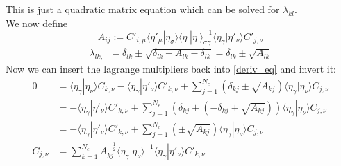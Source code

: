 This is just a quadratic matrix equation which can be solved for $\lambda_{kl}$.\\
We now define
\begin{equation}
    A_{ij}:= C'_{i,\mu} \langle \eta'_\mu|\eta_\sigma \rangle\langle \eta_\cdot|\eta_\cdot \rangle^{-1}_{\sigma\gamma} \langle \eta_\gamma|\eta'_\nu \rangle C'_{j,\nu}
\end{equation}
\begin{align}
    \lambda_{lk,\pm} = \delta_{lk} \pm \sqrt{\delta_{lk}+A_{lk}-\delta_{lk}} = \delta_{lk} \pm \sqrt{A_{lk}}
\end{align}
Now we can insert the lagrange multipliers back into \eqref{deriv_eq} and invert it:
\begin{align}
   0&=\langle \eta_\gamma|\eta_\nu \rangle C_{k,\nu} - \langle \eta_\gamma|\eta'_\nu \rangle C'_{k,\nu} + \sum\limits_{j=1}^{N_e} \left(\delta_{kj} \pm \sqrt{A_{kj}}\right) \langle \eta_\gamma|\eta_\nu \rangle  C_{j,\nu}\\
    &= - \langle \eta_\gamma|\eta'_\nu \rangle C'_{k,\nu} + \sum\limits_{j=1}^{N_e} \left(\delta_{kj}+\left(- \delta_{kj} \pm \sqrt{A_{kj}}\right)\right) \langle \eta_\gamma|\eta_\nu \rangle  C_{j,\nu}\\
    &= - \langle \eta_\gamma|\eta'_\nu \rangle C'_{k,\nu} + \sum\limits_{j=1}^{N_e} \left(\pm \sqrt{A_{kj}}\right) \langle \eta_\gamma|\eta_\nu \rangle  C_{j,\nu}\\
    C_{j,\nu}&= \sum\limits_{k=1}^{N_e}  A^{-\frac{1}{2}}_{kj} \langle \eta_\gamma|\eta_\nu \rangle^{-1} \langle \eta_\gamma|\eta'_\nu \rangle C'_{k,\nu}
\end{align}
